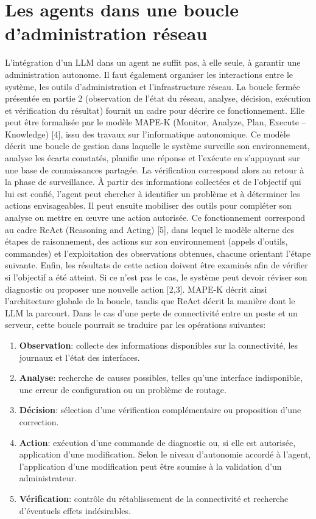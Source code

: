 \section{Les agents dans une boucle d’administration réseau}
L'intégration d'un LLM dans un agent ne suffit pas, à elle seule, à garantir une administration autonome. Il faut également organiser les interactions entre le système, les outils d'administration et l'infrastructure réseau. La boucle fermée présentée en partie 2 (observation de l'état du réseau, analyse, décision, exécution et vérification du résultat) fournit un cadre pour décrire ce fonctionnement. Elle peut être formalisée par le modèle MAPE-K (Monitor, Analyze, Plan, Execute – Knowledge) [4], issu des travaux sur l'informatique autonomique. Ce modèle décrit une boucle de gestion dans laquelle le système surveille son environnement, analyse les écarts constatés, planifie une réponse et l'exécute en s'appuyant sur une base de connaissances partagée. La vérification correspond alors au retour à la phase de surveillance.
À partir des informations collectées et de l'objectif qui lui est confié, l'agent peut chercher à identifier un problème et à déterminer les actions envisageables. Il peut ensuite mobiliser des outils pour compléter son analyse ou mettre en œuvre une action autorisée. Ce fonctionnement correspond au cadre ReAct (Reasoning and Acting) [5], dans lequel le modèle alterne des étapes de raisonnement, des actions sur son environnement (appels d'outils, commandes) et l'exploitation des observations obtenues, chacune orientant l'étape suivante. Enfin, les résultats de cette action doivent être examinés afin de vérifier si l'objectif a été atteint. Si ce n'est pas le cas, le système peut devoir réviser son diagnostic ou proposer une nouvelle action [2,3]. MAPE-K décrit ainsi l'architecture globale de la boucle, tandis que ReAct décrit la manière dont le LLM la parcourt.
Dans le cas d'une perte de connectivité entre un poste et un serveur, cette boucle pourrait se traduire par les opérations suivantes:
\begin{enumerate}
    \item \textbf{Observation}: collecte des informations disponibles sur la connectivité, les journaux et l'état des interfaces.
    \item \textbf{Analyse}: recherche de causes possibles, telles qu'une interface indisponible, une erreur de configuration ou un problème de routage.
    \item \textbf{Décision}: sélection d'une vérification complémentaire ou proposition d'une correction.
    \item \textbf{Action}: exécution d'une commande de diagnostic ou, si elle est autorisée, application d'une modification. Selon le niveau d'autonomie accordé à l'agent, l'application d'une modification peut être soumise à la validation d'un administrateur.
    \item \textbf{Vérification}: contrôle du rétablissement de la connectivité et recherche d'éventuels effets indésirables.
\end{enumerate}
